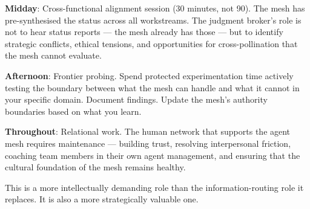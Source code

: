 \textbf{Midday}: Cross-functional alignment session (30 minutes, not 90). The mesh has pre-synthesised the status across all workstreams. The judgment broker's role is not to hear status reports --- the mesh already has those --- but to identify strategic conflicts, ethical tensions, and opportunities for cross-pollination that the mesh cannot evaluate.

\textbf{Afternoon}: Frontier probing. Spend protected experimentation time actively testing the boundary between what the mesh can handle and what it cannot in your specific domain. Document findings. Update the mesh's authority boundaries based on what you learn.

\textbf{Throughout}: Relational work. The human network that supports the agent mesh requires maintenance --- building trust, resolving interpersonal friction, coaching team members in their own agent management, and ensuring that the cultural foundation of the mesh remains healthy.

This is a more intellectually demanding role than the information-routing role it replaces. It is also a more strategically valuable one.
